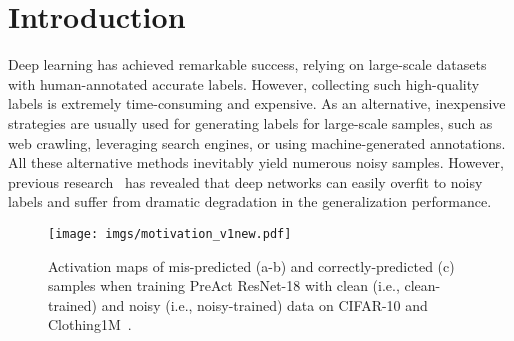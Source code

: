 \documentclass[10pt,twocolumn,letterpaper]{article}
\begin{document}
\section{Introduction}
\label{sec:intro}
Deep learning has achieved remarkable success, relying on large-scale datasets with human-annotated accurate labels. However, collecting such high-quality labels is extremely time-consuming and expensive. As an alternative, inexpensive strategies are usually used for generating labels for large-scale samples, such as web crawling, leveraging search engines, or using machine-generated annotations. All these alternative methods inevitably yield numerous noisy samples. However, previous research~\cite{arpit2017closer} has revealed that deep networks can easily overfit to noisy labels and suffer from dramatic degradation in the generalization performance. 


\begin{figure}[!t]
\centering
\texttt{[image: imgs/motivation\_v1new.pdf]}
\vspace{-0.6em}
\caption{Activation maps of mis-predicted (a-b) and correctly-predicted (c) samples when training PreAct ResNet-18 with clean (i.e., clean-trained) and noisy (i.e., noisy-trained) data on CIFAR-10 and Clothing1M~\cite{Clothing1M}.
}
\label{fig:motvation_v1}
\vspace{-1.0em}
\end{figure}
\end{document}
